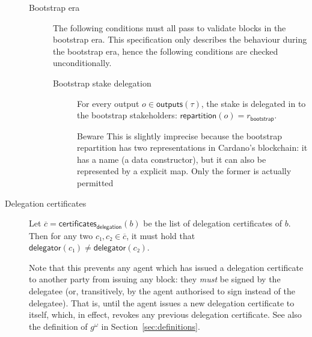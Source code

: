 \documentclass{article}
\newenvironment{treacherous}{\begin{bclogo}[noborder=true,
    logo=\bcdz, epBarre=3, couleurBarre=Red]{Beware}}{\end{bclogo}}
\newcommand{\outputs}[1]{\mathsf{outputs}(#1)}
\newcommand{\transitivefix}[1]{{#1}^ω}
\newcommand{\delegator}[1]{\mathsf{delegator}(#1)}
\newcommand{\delegationcertificates}[1]{\mathsf{certificates}_\mathsf{delegation}(#1)}
\newcommand{\repartition}[1]{\mathsf{repartition}(#1)}
\newcommand{\bootstraprepartition}{r_\mathsf{bootstrap}}
\begin{document}
\begin{description}
\begin{description}
  \item[Bootstrap era] The following conditions must all pass to
    validate blocks in the bootstrap era. This specification only
    describes the behaviour during the bootstrap era, hence the
    following conditions are checked unconditionally.
    \begin{description}
    \item[Bootstrap stake delegation] For every output $o∈\outputs{τ}$, the
      stake is delegated in to the bootstrap stakeholders:
      $\repartition{o} = \bootstraprepartition$.

      \begin{treacherous}
        This is slightly imprecise because the bootstrap repartition
        has two representations in Cardano's blockchain: it has a
        name (a data constructor), but it can also be represented by a
        explicit map. Only the former is actually permitted
      \end{treacherous}

    \end{description}
  \end{description}

\item[Delegation certificates] Let
  $\overline{c}=\delegationcertificates{b}$ be the list of delegation
  certificates of $b$. Then for any two $c₁,c₂∈\overline{c}$, it must
  hold that $\delegator{c₁}≠\delegator{c₂}$.

  Note that this prevents any agent which has issued a delegation certificate to
  another party from issuing any block: they \emph{must} be signed by the
  delegatee (or, transitively, by the agent authorised to sign instead of the
  delegatee). That is, until the agent issues a new delegation certificate to
  itself, which, in effect, revokes any previous delegation certificate. See
  also the definition of $\transitivefix{g}$ in Section~\ref{sec:definitions}.


\end{description}
\end{document}
